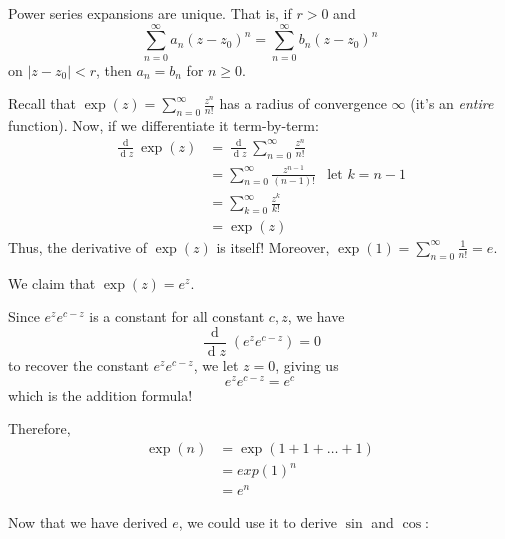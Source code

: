 \documentclass[12pt]{article}
\renewcommand{\d}{\ensuremath{\operatorname{d}}}
\begin{document}
\begin{corollary}
    Power series expansions are unique. That is, if $r>0$ and \[\sum_{n=0}^{\infty}a_n(z-z_0)^{n} = \sum_{n=0}^{\infty}b_n(z-z_0)^{n}\]
    on $|z-z_0|<r$, then $a_n=b_n$ for $n\geq 0$.
\end{corollary}

\rmk Recall that $\exp(z)=\sum_{n=0}^{\infty}\frac{z^n}{n!}$ has a radius of convergence $\infty$ (it's an \textit{entire} function). Now, if we differentiate it term-by-term:
\begin{align*}
    \frac{\d}{\d z}\exp(z)&=\frac{\d}{\d z}\sum_{n=0}^{\infty}\frac{z^n}{n!}\\
    &= \sum_{n=0}^{\infty}\frac{z^{n-1}}{(n-1)!} &\text{let }k=n-1\\
    &= \sum_{k=0}^{\infty} \frac{z^k}{k!}\\
    &= \exp(z)
\end{align*}
Thus, the derivative of $\exp(z)$ is itself! Moreover, $\exp(1)=\sum_{n=0}^{\infty}\frac{1}{n!}=e$.

\rmk We claim that $\exp(z)=e^z$.

Since $e^ze^{c-z}$ is a constant for all constant $c,z$, we have \[\frac{\d}{\d z}(e^ze^{c-z})=0\]
to recover the constant $e^ze^{c-z}$, we let $z=0$, giving us \[e^{z}e^{c-z}=e^{c}\]
which is the addition formula!

Therefore, \begin{align*}
    \exp(n) &= \exp(1+1+\dots+1)\\
    &= exp(1)^{n}\\
    &=e^n
\end{align*}

Now that we have derived $e$, we could use it to derive $\sin$ and $\cos$:
\end{document}
